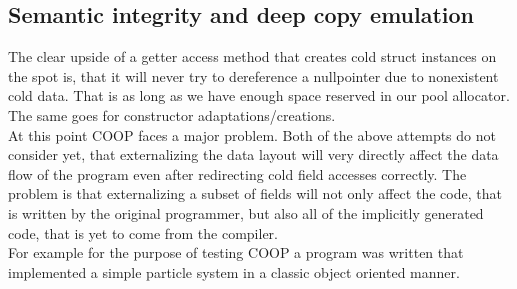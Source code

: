 \subsection{Semantic integrity and deep copy emulation}\label{deep_copy_emulation}
The clear upside of a getter access method that creates cold struct instances on the spot is, that it will never try to dereference a nullpointer due to nonexistent cold data. That is as long as we have enough space reserved in our pool allocator. The same goes for constructor adaptations/creations.\\
At this point COOP faces a major problem. Both of the above attempts do not consider yet, that externalizing the data layout will very directly affect the data flow of the program even after redirecting cold field accesses correctly. The problem is that externalizing a subset of fields will not only affect the code, that is written by the original programmer, but also all of the implicitly generated code, that is yet to come from the compiler.\\
For example for the purpose of testing COOP a program was written that implemented a simple particle system in a classic object oriented manner.
